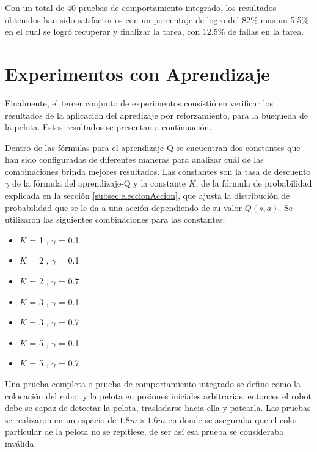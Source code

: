 Con un total de 40 pruebas de comportamiento integrado, los resultados obtenidos han sido satifactorios con un porcentaje de logro del 82\% mas un 5.5\% en el cual se logró recuperar y finalizar la tarea, con 12.5\% de fallas en la tarea. %



\section{Experimentos con Aprendizaje}\label{sec:experimentosAprend}

Finalmente, el tercer conjunto de experimentos consistió en verificar los resultados de la aplicaci\'on del apredizaje por reforzamiento, para la búsqueda de la pelota. Estos resultados se presentan a continuaci\'on.

Dentro de las fórmulas para el aprendizaje-Q se encuentran dos constantes que han sido configuradas de diferentes maneras para analizar cuál de las combinaciones brinda mejores resultados. Las constantes son la tasa de descuento $\gamma$ de la fórmula del aprendizaje-Q y la constante $K$, de la fórmula de probabilidad explicada en la secci\'on \ref{subsec:eleccionAccion}, que ajusta la distribución de probabilidad que se le da a una acción dependiendo de su valor $Q(s,a)$. Se utilizaron las siguientes combinaciones para las constantes:

\begin{itemize}
 \setlength\itemsep{0.3pt}
\item $K$ = 1 , $\gamma$ = 0.1
\item $K$ = 2 , $\gamma$ = 0.1 
\item $K$ = 2 , $\gamma$ = 0.7
\item $K$ = 3 , $\gamma$ = 0.1
\item $K$ = 3 , $\gamma$ = 0.7
\item $K$ = 5 , $\gamma$ = 0.1
\item $K$ = 5 , $\gamma$ = 0.7
   
\end{itemize}

Una prueba completa o prueba de comportamiento integrado se define como la colocaci\'on del robot y la pelota en posiones iniciales arbitrarias, entonces el robot debe se capaz de detectar la pelota, trasladarse hacia ella y patearla. Las pruebas se realizaron en un espacio de $1.8 m \times 1.6 m$
en donde se aseguraba que el color particular de la pelota no se repitiese, de ser así esa prueba se consideraba inválida.

